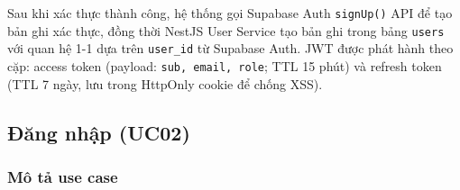 \documentclass[a4paper,12pt]{extreport}
\begin{document}
\begin{sloppypar}
Sau khi xác thực thành công, hệ thống gọi Supabase Auth \texttt{signUp()} API để tạo bản ghi xác thực, đồng thời NestJS User Service tạo bản ghi trong bảng \texttt{users} với quan hệ 1-1 dựa trên \texttt{user\_id} từ Supabase Auth. JWT được phát hành theo cặp: access token (payload: \texttt{sub, email, role}; TTL 15 phút) và refresh token (TTL 7 ngày, lưu trong HttpOnly cookie để chống XSS).
\end{sloppypar}

\subsection{Đăng nhập (UC02)}
\subsubsection{Mô tả use case}
\end{document}
